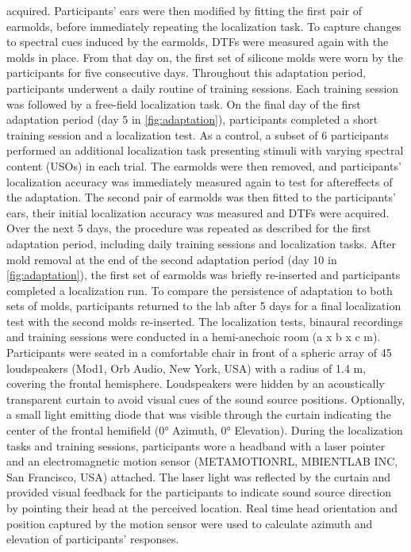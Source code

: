 acquired. Participants’ ears were then modified by fitting the first pair of earmolds, before immediately repeating the localization task. To capture changes to spectral cues induced by the earmolds, DTFs were measured again with the molds in place. From that day on, the first set of silicone molds were worn by the participants for five consecutive days. Throughout this adaptation period, participants underwent a daily routine of training sessions. Each training session was followed by a free-field localization task. On the final day of the first adaptation period (day 5 in \cref{fig:adaptation}), participants completed a short training session and a localization test. As a control, a subset of 6 participants performed an additional localization task presenting stimuli with varying spectral content (USOs) in each trial. The earmolds were then removed, and participants’ localization accuracy was immediately measured again to test for aftereffects of the adaptation. The second pair of earmolds was then fitted to the participants’ ears, their initial localization accuracy was measured and DTFs were acquired. Over the next 5 days, the procedure was repeated as described for the first adaptation period, including daily training sessions and localization tasks. After mold removal at the end of the second adaptation period (day 10 in \cref{fig:adaptation}), the first set of earmolds was briefly re-inserted and participants completed a localization run. To compare the persistence of adaptation to both sets of molds, participants returned to the lab after 5 days for a final localization test with the second molds re-inserted. The localization tests, binaural recordings and training sessions were conducted in a hemi-anechoic room (a x b x c m). Participants were seated in a comfortable chair in front of a spheric array of 45 loudspeakers (Mod1, Orb Audio, New York, USA) with a radius of 1.4 m, covering the frontal hemisphere. Loudspeakers were hidden by an acoustically transparent curtain to avoid visual cues of the sound source positions. Optionally, a small light emitting diode that was visible through the curtain indicating the center of the frontal hemifield (0° Azimuth, 0° Elevation). During the localization tasks and training sessions, participants wore a headband with a laser pointer and an electromagnetic motion sensor (METAMOTIONRL, MBIENTLAB INC, San Francisco, USA) attached. The laser light was reflected by the curtain and provided visual feedback for the participants to indicate  sound source direction by pointing their head at the perceived location. Real time head orientation and position captured by the motion sensor were used to calculate azimuth and elevation of participants’ responses.

